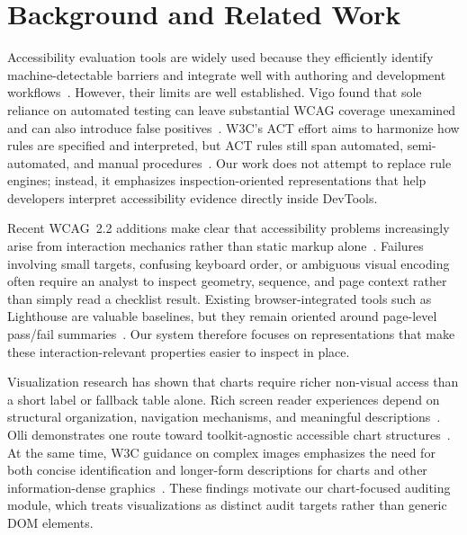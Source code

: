 \section{Background and Related Work}
\label{sec:related}

Accessibility evaluation tools are widely used because they efficiently identify machine-detectable barriers and integrate well with authoring and development workflows~\cite{w3cToolsOverview,w3cEvalOverview}. However, their limits are well established. Vigo \etal{} found that sole reliance on automated testing can leave substantial WCAG coverage unexamined and can also introduce false positives~\cite{vigo2013benchmarking}. W3C's ACT effort aims to harmonize how rules are specified and interpreted, but ACT rules still span automated, semi-automated, and manual procedures~\cite{w3cActOverview}. Our work does not attempt to replace rule engines; instead, it emphasizes inspection-oriented representations that help developers interpret accessibility evidence directly inside DevTools.

Recent WCAG~2.2 additions make clear that accessibility problems increasingly arise from interaction mechanics rather than static markup alone~\cite{wcag22rec,wcag22new}. Failures involving small targets, confusing keyboard order, or ambiguous visual encoding often require an analyst to inspect geometry, sequence, and page context rather than simply read a checklist result. Existing browser-integrated tools such as Lighthouse are valuable baselines, but they remain oriented around page-level pass/fail summaries~\cite{lighthouseOverview,lighthouseA11y}. Our system therefore focuses on representations that make these interaction-relevant properties easier to inspect in place.

Visualization research has shown that charts require richer non-visual access than a short label or fallback table alone. Rich screen reader experiences depend on structural organization, navigation mechanisms, and meaningful descriptions~\cite{zong2022rich}. Olli demonstrates one route toward toolkit-agnostic accessible chart structures~\cite{blanco2022olli}. At the same time, W3C guidance on complex images emphasizes the need for both concise identification and longer-form descriptions for charts and other information-dense graphics~\cite{w3cComplexImages}. These findings motivate our chart-focused auditing module, which treats visualizations as distinct audit targets rather than generic DOM elements.

